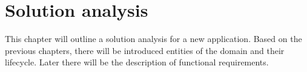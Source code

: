 
\chapter{Solution analysis}\label{ch:solution-analysis}

This chapter will outline a solution analysis for a new application.
Based on the previous chapters, there will be introduced entities of the domain and their lifecycle.
Later there will be the description of functional requirements.











